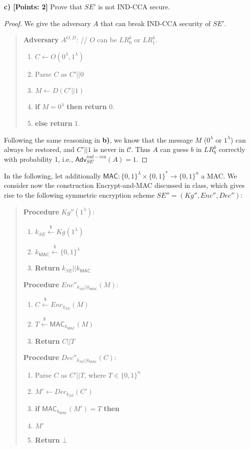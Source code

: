 \documentclass[12pt]{article}
\newcommand{\bits}{\{0,1\}}
\newcommand{\getsr}{\stackrel{\$}{\gets}}
\newcommand{\Adv}{\textsf{Adv}}
\newcommand{\tab}{\hspace{0.3in}}
\newcommand{\MAC}{\textsf{MAC}}
\newcommand{\C}{\mathcal{C}}
\theoremstyle{definition}
\begin{document}
{\bf c) [Points: 2]} Prove that $SE'$ is not IND-CCA secure.
\begin{proof}
We give the adversary $A$ that can break IND-CCA security of $SE'$.
\begin{quote}
{\bf Adversary} $A^{O, D}$: // $O$ can be $LR_0^k$ or $LR_1^k$.
\begin{enumerate}
\item $C \gets O(0^\lambda, 1^\lambda)$
\item Parse $C$ as $C'||0$
\item $M \gets D(C'||1)$
\item {\bf if} $M=0^\lambda$ {\bf then return} 0.
\item {\bf else return} 1.
\end{enumerate}
\end{quote}
Following the same reasoning in {\bf b)}, we know that the message $M$ ($0^\lambda$ or $1^\lambda$) can always be restored, and $C'||1$ is never in $\C$. Thus $A$ can guess $b$ in $LR_b^k$ correctly with probability 1, i.e., $\Adv_{SE'}^{ind-cca}(A) = 1$.
\end{proof}

In the following, let additionally $\MAC : \bits^\lambda \times \bits^* \to \bits^n$ a MAC. We consider now the construction Encrypt-and-MAC discussed in class, which gives rise to the following symmetric encryption scheme $SE'' = (Kg'', Enc'', Dec'')$:
\begin{quote}
\begin{minipage}[t]{.3\textwidth}
{\bf Procedure} $Kg''(1^\lambda)$:
\begin{enumerate}
\item $k_{SE} \getsr Kg(1^\lambda)$
\item $k_{\MAC} \getsr \bits^\lambda$
\item {\bf Return} $k_{SE}||k_{\MAC}$
\end{enumerate}
\end{minipage}
\begin{minipage}[t]{.5\textwidth}
{\bf Procedure} $Enc''_{k_{SE}||k_{\MAC}}(M)$:
\begin{enumerate}
\item $C \getsr Enc_{k_{SE}} (M)$
\item $T \getsr \MAC_{k_{\MAC}}(M)$
\item {\bf Return} $C||T$
\end{enumerate}
\end{minipage}

\begin{minipage}[t]{.5\textwidth}
{\bf Procedure} $Dec''_{k_{SE}||k_{\MAC}}(C)$:
\begin{enumerate}
\item Parse $C$ as $C'||T$, where $T \in \bits^n$
\item $M' \gets Dec_{k_{SE}} (C')$
\item {\bf if} $\MAC_{k_{\MAC}}(M') = T$ {\bf then}
\item \tab {\bf Return} $M'$
\item {\bf Return} $\bot$
\end{enumerate}
\end{minipage}
\end{quote}
\end{document}
